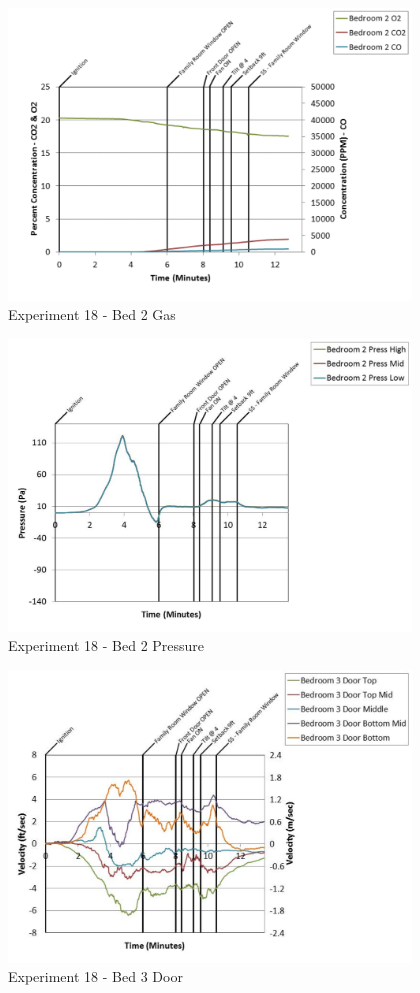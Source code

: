 \documentclass{article}
\begin{document}
\begin{appendices}
	\begin{figure}[h!]
		\centering
		\includegraphics[height=3.05in]{0_Images/Results_Charts/Exp_18_Charts/Bed2Gas.pdf}
		\caption{Experiment 18 - Bed 2 Gas}
	\end{figure}
 
	\clearpage

	\begin{figure}[h!]
		\centering
		\includegraphics[height=3.05in]{0_Images/Results_Charts/Exp_18_Charts/Bed2Pressure.pdf}
		\caption{Experiment 18 - Bed 2 Pressure}
	\end{figure}
 

	\begin{figure}[h!]
		\centering
		\includegraphics[height=3.05in]{0_Images/Results_Charts/Exp_18_Charts/Bed3Door.pdf}
		\caption{Experiment 18 - Bed 3 Door}
	\end{figure}
 

\end{appendices}
\end{document}
